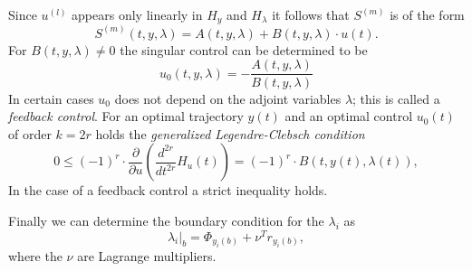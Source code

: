 \documentclass[12pt,a4paper]{article}
\begin{document}
\begin{enumerate}
\begin{enumerate}
                Since $u^{(l)}$ appears only linearly in $H_{y}$ and $H_{\lambda}$ it follows
                that $S^{(m)}$ is of the form
                 \begin{equation}
                   S^{(m)}(t,y,\lambda) = A(t,y,\lambda) + B(t,y,\lambda)\cdot u(t).
                 \end{equation}
                For $B(t,y,\lambda)\not=0$ the singular control can be
                determined to be
                 \begin{equation}
                   u_{0}(t,y,\lambda) = - \frac{A(t,y,\lambda)}{B(t,y,\lambda)} \label{singular-control}
                 \end{equation}
                In certain cases $u_{0}$ does not depend on the adjoint
                variables $\lambda$; this is called a {\em feedback
                control}.  For an optimal trajectory $y(t)$ and an
                optimal control $u_{0}(t)$ of order $k = 2r$ holds the
                {\em generalized Legendre-Clebsch condition\/} \cite{th3}
                  \begin{equation}
                    0 \leq (-1)^{r} \cdot \frac{\partial}{\partial u}
                     \left(\frac{d^{2r}}{dt^{2r}}H_{u}(t)\right)
                     =  (-1)^{r} \cdot  B(t,y(t),\lambda(t)),
                  \end{equation}
                In the case of a feedback control a strict inequality holds.
        \end{enumerate}
\end{enumerate}
Finally we can determine the boundary condition for the $\lambda_{i}$ as
\begin{equation}
  \left. \lambda_{i} \right |_{b} = \Phi_{y_{i}(b)} + \nu^{T} r_{y_{i}(b)},
\end{equation}
where the $\nu$ are Lagrange multipliers.
\end{document}
